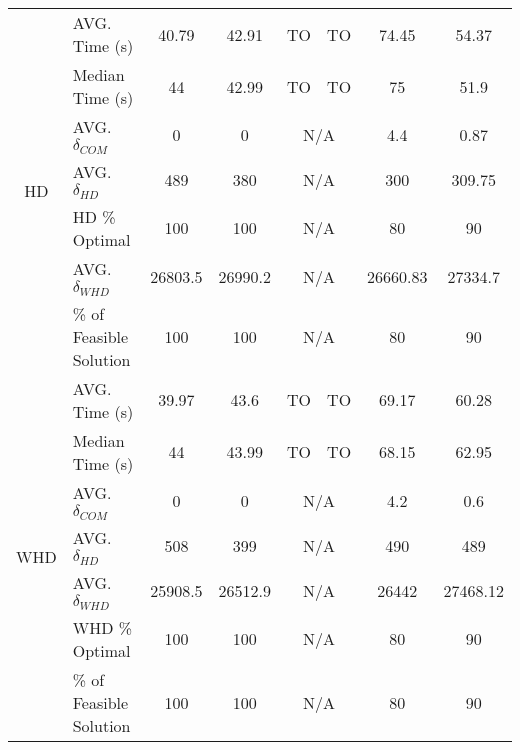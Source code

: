 \documentclass[twocolumn,natbib]{svjour3}          %
\begin{document}
\begin{table*}[!t]
\begin{tabular}{cl|c|c|c|c|c|c|}
\multicolumn{1}{|c|}{\multirow{7}{*}{HD}} & AVG.  Time (s)  &   40.79 &        42.91   & TO & TO           & 74.45& 54.37           \\ \cline{2-8} 
\multicolumn{1}{|c|}{}                     & Median Time (s)   &  44 &   42.99         &TO &TO                  & 75& 51.9     \\ \cline{2-8} 
\multicolumn{1}{|c|}{}                     & AVG.  $\delta_{COM}$ &    0                 & 0   & \multicolumn{2}{c|}{N/A}              & 4.4&  0.87    \\ \cline{2-8} 
\multicolumn{1}{|c|}{}                     & AVG. $\delta_{HD}$ &   489 &  380        & \multicolumn{2}{c|}{N/A}                          & 300 &  309.75  \\ \cline{2-8} 
\multicolumn{1}{|c|}{}                     & HD \% Optimal    &        100             &         100   & \multicolumn{2}{c|}{N/A}     & 80 &  90      \\ \cline{2-8} 
\multicolumn{1}{|c|}{}                     & AVG. $\delta_{WHD}$ &   26803.5 & 26990.2      & \multicolumn{2}{c|}{N/A}                      &26660.83 & 27334.7         \\ \cline{2-8}
\multicolumn{1}{|c|}{}                     & \% of Feasible Solution & 100 & 100   & \multicolumn{2}{c|}{N/A}                    &80 &   90         \\ \hline

\multicolumn{1}{|c|}{\multirow{7}{*}{WHD}} & AVG.  Time (s)  &  39.97   &   43.6     & TO & TO & 69.17&                       60.28 \\ \cline{2-8} 
\multicolumn{1}{|c|}{}                     & Median Time (s)   &  44 & 43.99         & TO & TO      & 68.15&                    62.95  \\ \cline{2-8} 
\multicolumn{1}{|c|}{}                     & AVG.  $\delta_{COM}$ &       0              &      0   & \multicolumn{2}{c|}{N/A}     & 4.2&           0.6  \\ \cline{2-8} 
\multicolumn{1}{|c|}{}                     & AVG. $\delta_{HD}$ &  508 &   399    & \multicolumn{2}{c|}{N/A}                           & 490&        489 \\ \cline{2-8} 
\multicolumn{1}{|c|}{}                     & AVG. $\delta_{WHD}$ &   25908.5 & 26512.9   & \multicolumn{2}{c|}{N/A}                        &  26442     & 27468.12      \\ \cline{2-8} 
\multicolumn{1}{|c|}{}                     & WHD \% Optimal    &      100               &    100   & \multicolumn{2}{c|}{N/A}          &80 &     90  \\ \cline{2-8}
\multicolumn{1}{|c|}{}                     & \% of Feasible Solution & 100 & 100   & \multicolumn{2}{c|}{N/A}                    &80 &   90           \\ \hline

\end{tabular}%
\end{table*}
\end{document}
